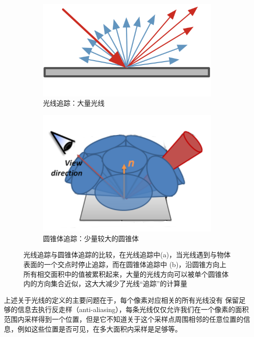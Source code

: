 \begin{figure}
	\begin{subfigure}[b]{0.5\textwidth}
		\includegraphics[width=\textwidth]{figures/vct/vct-1-1}
		\caption{光线追踪：大量光线}
	\end{subfigure}
	\begin{subfigure}[b]{0.5\textwidth}
		\includegraphics[width=\textwidth]{figures/vct/vct-1-2}
		\caption{圆锥体追踪：少量较大的圆锥体}
	\end{subfigure}
	\caption{光线追踪与圆锥体追踪的比较，在光线追踪中(a)，当光线遇到与物体表面的一个交点时停止追踪，而在圆锥体追踪中 (b)，沿圆锥方向上所有相交面积中的值被累积起来，大量的光线方向可以被单个圆锥体内的方向集合近似，这大大减少了光线“追踪”的计算量}
	\label{f:vct-ray-vs-cone}
\end{figure}

上述关于光线的定义的主要问题在于，每个像素对应相关的所有光线没有 保留足够的信息去执行反走样（anti-aliasing），每条光线仅仅允许我们在一个像素的面积范围内采样得到一个位置，但是它不知道关于这个采样点周围相邻的任意位置的信息，例如这些位置是否可见，在多大面积内采样是足够等。

